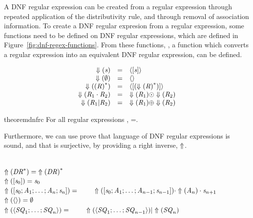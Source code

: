 \documentclass[numbers]{sigplanconf}
\begin{document}
A DNF regular expression can be created from a regular expression through repeated
application of the distributivity rule, and through removal of association information.
To create a DNF regular expresion from a regular expression,
some functions need to be defined on DNF regular expressions,
which are defined in Figure~\ref{fig:dnf-regex-functions}.
From these functions, \ToDNFRegex{}, a function which converts a regular expression into
an equivalent DNF regular expression, can be defined.

\begin{definition}
\leavevmode
\[
\begin{array}{rcl}
\Downarrow(\mathit{s}) & = & \langle[\mathit{s}]\rangle\\
\Downarrow(\emptyset) & = & \langle\rangle\\
\Downarrow({(\mathit{R})}^*) & = & \langle[({\Downarrow(\mathit{R})}^*)]\rangle\\
\Downarrow(\mathit{R}_1\cdot\mathit{R}_2) & = & \Downarrow(\mathit{R}_1) \odot \Downarrow(\mathit{R}_2)\\
\Downarrow(\mathit{R}_1|\mathit{R}_2) & = & \Downarrow(\mathit{R}_1) \oplus \Downarrow(\mathit{R}_2)\\
\end{array}
\]
\end{definition}
\begin{restatable}{theorem}{dnfrc}
\label{thm:completeness-dnf-lenses}
For all regular expressions \Regex{},
\LanguageOf{\ToDNFRegex(\Regex)}=\LanguageOf{\Regex{}}.
\end{restatable}

Furthermore, we can use prove that language of DNF regular expressions is sound,
and that \ToDNFRegex{} is surjective, by providing a right inverse, $\Uparrow$.

\begin{definition}\leavevmode\\
$\Uparrow({\mathit{DR}}^*) = {\Uparrow(\mathit{DR})}^*$\\
$\Uparrow([\mathit{s}_0]) = \mathit{s}_0$\\
$\Uparrow([\mathit{s}_0;\mathit{A}_1;\ldots
;\mathit{A}_n;\mathit{s}_n]) =\\
\hspace*{2em}\Uparrow([\mathit{s}_0;\mathit{A}_1;
\ldots;\mathit{A}_{n-1};\mathit{s}_{n-1}])
\cdot \Uparrow(\mathit{A}_n) \cdot \mathit{s}_{n+1}$\\
$\Uparrow(\langle\rangle)=\emptyset$\\
$\Uparrow(\langle\mathit{SQ}_1;\ldots;\mathit{SQ}_n\rangle)=\\
\hspace*{2em}\Uparrow(\langle\mathit{SQ}_1;\ldots;\mathit{SQ}_{n-1}\rangle)
| \Uparrow(\mathit{SQ}_n)$
\end{definition}
\end{document}
